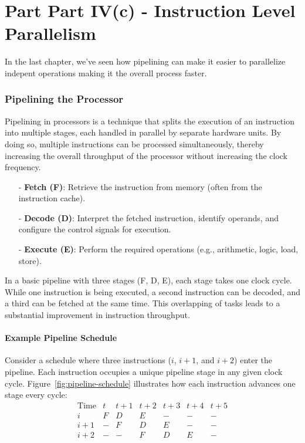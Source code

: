\chapter{Part Part IV(c) - Instruction Level Parallelism}
In the last chapter, we've seen how pipelining can make it easier to parallelize indepent operations making it the overall process faster.

\subsection{Pipelining the Processor}
Pipelining in processors is a technique that splits the execution of an instruction into multiple stages, each handled in parallel by separate hardware units. By doing so, multiple instructions can be processed simultaneously, thereby increasing the overall throughput of the processor without increasing the clock frequency.

\begin{itemize}
    \item[-] \textbf{Fetch (F)}: Retrieve the instruction from memory (often from the instruction cache).
    \item[-] \textbf{Decode (D)}: Interpret the fetched instruction, identify operands, and configure the control signals for execution.
    \item[-] \textbf{Execute (E)}: Perform the required operations (e.g., arithmetic, logic, load, store).
\end{itemize}

\noindent In a basic pipeline with three stages (F, D, E), each stage takes one clock cycle. While one instruction is being executed, a second instruction can be decoded, and a third can be fetched at the same time. This overlapping of tasks leads to a substantial improvement in instruction throughput.

\subsubsection*{Example Pipeline Schedule}
Consider a schedule where three instructions (\(i\), \(i+1\), and \(i+2\)) enter the pipeline. Each instruction occupies a unique pipeline stage in any given clock cycle. Figure~\ref{fig:pipeline-schedule} illustrates how each instruction advances one stage every cycle:
\[
\begin{array}{c|cccccc}
\text{Time} & t & t+1 & t+2 & t+3 & t+4 & t+5 \\ \hline
i     & F & D & E & - & - & - \\
i+1   & - & F & D & E & - & - \\
i+2   & - & - & F & D & E & - \\
\end{array}
\]

